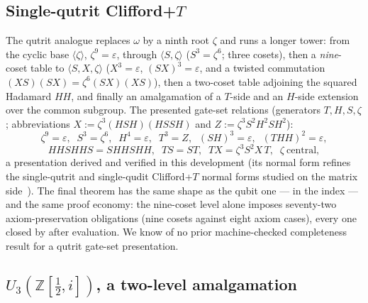 \subsection{Single-qutrit Clifford+$T$}

The qutrit analogue replaces $\omega$ by a ninth root $\zeta$ and runs a
longer tower: from the cyclic base $\langle \zeta \rangle$,
$\zeta^9 = \varepsilon$, through
$\langle S, \zeta \rangle$ ($S^3 = \zeta^6$; three cosets), then a
\emph{nine}-coset table to $\langle S, X, \zeta \rangle$
($X^3 = \varepsilon$, $(SX)^3 = \varepsilon$, and a twisted commutation
$(XS)(SX) = \zeta^6 (SX)(XS)$), then a two-coset table adjoining the
squared Hadamard $H\!H$, and finally an amalgamation of a $T$-side and an
$H$-side extension over the common subgroup.  The presented gate-set
relations (generators $T, H, S, \zeta$; abbreviations
$X := \zeta^3 (HSH)(HSSH)$ and $Z := \zeta^3 S^2 H^2 S H^2$):
\[
  \zeta^9 = \varepsilon,\;\;
  S^3 = \zeta^6,\;\;
  H^4 = \varepsilon,\;\;
  T^3 = Z,\;\;
  (SH)^3 = \varepsilon,\;\;
  (THH)^2 = \varepsilon,
\]
\[
  HHSHHS = SHHSHH,\;\;
  TS = ST,\;\;
  TX = \zeta^3 S^2 X\, T,\;\;
  \zeta\ \text{central},
\]
a presentation derived and verified in this development (its normal form
refines the single-qutrit and single-qudit Clifford+$T$ normal forms
studied on the matrix side~\cite{prakash2018qutrit,jain2020qudit}).  The final theorem has the same shape as
the qubit one ---  in the index ---
and the same proof economy: the nine-coset level alone imposes
seventy-two axiom-preservation obligations (nine cosets against eight
axiom cases), every one closed by  after evaluation.  We know of no prior machine-checked completeness
result for a qutrit gate-set presentation.

\subsection{$U_3(\mathbb{Z}[\tfrac12,i])$, a two-level amalgamation}

